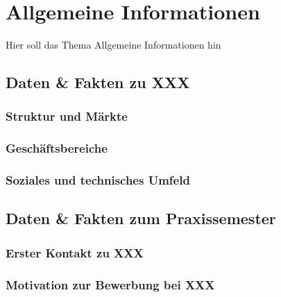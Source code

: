 
\chapter{Allgemeine Informationen}

Hier soll das Thema Allgemeine Informationen hin

\section{Daten \& Fakten zu XXX} 

\subsection{Struktur und M\"arkte}

\subsection{Gesch\"aftsbereiche}

\subsection{Soziales und technisches Umfeld}

\section{Daten \& Fakten zum Praxissemester} 

\subsection{Erster Kontakt zu XXX}

\subsection{Motivation zur Bewerbung bei XXX}

